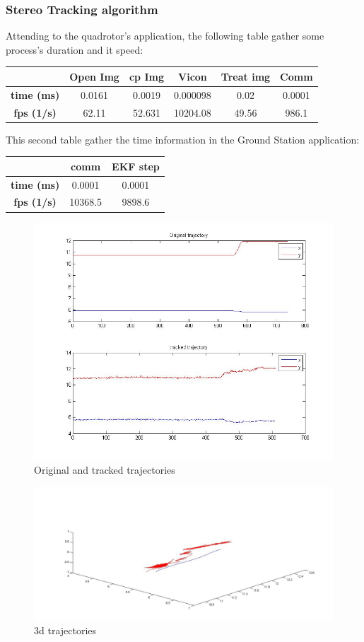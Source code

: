 	\subsubsection{Stereo Tracking algorithm}
		Attending to the quadrotor's application, the following table gather some process's duration and it speed:
		\newline
		\newline
		{
		\centering
			\begin{tabular}{|c|c|c|c|c|c|}
			\hline  					&  Open Img	&  cp Img 	& Vicon 	& Treat img & Comm  		\\ 
			\hline  \textbf{time (ms)}	& 	0.0161	& 0.0019	&	0.000098&  	 0.02	&	0.0001		\\ 
			\hline  \textbf{fps (1/s)}	&  	62.11	&  52.631	& 10204.08 	&  49.56	&	986.1	\\ 
			\hline 
			\end{tabular} 
		}
		\newline
		
		This second table gather the time information in the Ground Station application:
		\newline
		
		{
		\centering
			\begin{tabular}{|c|c|c|}
			\hline  					&  comm		&  EKF step	\\
			\hline  \textbf{time (ms)}	& 	0.0001	& 	0.0001	\\
			\hline  \textbf{fps (1/s)}	&  	10368.5	&   9898.6 	\\
			\hline 
			\end{tabular} 
		}
		\newline
	\begin{figure}[ph]
		\centering
		\includegraphics[width=0.7\linewidth]{../Images/c4/arch_trajs_stero}
		\caption{Original and tracked trajectories}
		\label{fig:arch_trajs_stero}
	\end{figure}
	
	\begin{figure}[ph]
		\centering
		\includegraphics[width=0.6\linewidth]{../Images/c4/arch_3d_trajs_stero}
		\caption{3d trajectories}
		\label{fig:arch_3d_trajs_stero}
	\end{figure}
